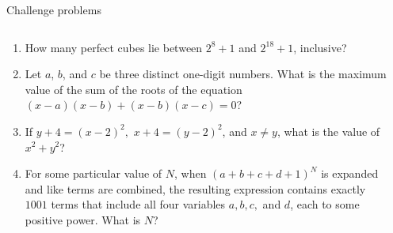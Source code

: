 \documentclass[9pt,aspectratio=169]{beamer}
\begin{document}
\begin{frame}{Challenge problems}
  \begin{columns}[T]
    \begin{column}{0.5\textwidth}
      \begin{enumerate}
        \item How many perfect cubes lie between $2^8+1$ and $2^{18}+1$, inclusive? %
        \item Let $a$, $b$, and $c$ be three distinct one-digit numbers. What is the maximum value of the sum of the roots of the equation $(x-a)(x-b)+(x-b)(x-c)=0$? %
        \item If $y+4 = (x-2)^2,$ $x+4 = (y-2)^2$, and $x \neq y$, what is the value of $x^2+y^2$? %
        \item For some particular value of $N$, when $(a+b+c+d+1)^N$ is expanded and like terms are combined, the resulting expression contains exactly $1001$ terms that include all four variables $a, b,c,$ and $d$, each to some positive power. What is $N$? %
      \end{enumerate}
    \end{column}
    \begin{column}{0.5\textwidth}
    \end{column}
  \end{columns}
\end{frame}

\end{document}
